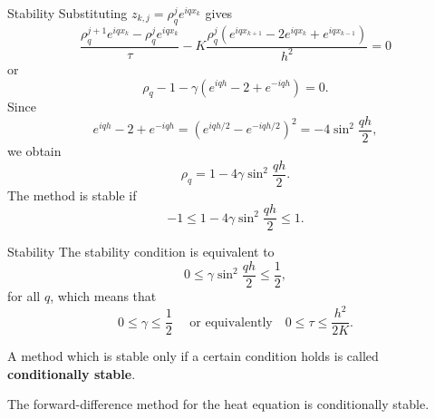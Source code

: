 \documentclass{beamer}
\begin{document}

\begin{frame}{Stability}
Substituting $z_{k,j}=\rho_{q}^{j}e^{iqx_{k}}$ gives
\[
\frac{\rho_{q}^{j+1}e^{iqx_{k}}-\rho_{q}^{j}e^{iqx_{k}}}{\tau}-
K\frac{\rho_{q}^{j}\left(e^{iqx_{k+1}}-2e^{iqx_{k}}+e^{iqx_{k-1}}\right)}{h^2}=0
\]
or
\[
\rho_{q}-1 - \gamma \left(e^{iqh}-2+e^{-iqh}\right)=0.
\]
Since
\[
e^{iqh}-2+e^{-iqh}=\left(e^{iqh/2}-e^{-iqh/2}\right)^{2}=-4\sin^{2}
\frac{qh}{2},
\]
we obtain
\[
\rho_{q}=1-4\gamma\sin^{2} \frac{qh}{2}.
\]
The method is stable if
\[
-1\leq 1-4\gamma\sin^{2}\frac{qh}{2}\leq 1 .
\]



\end{frame}


\begin{frame}{Stability}
The stability condition is equivalent to
\[
0\leq \gamma\sin^{2}\frac{qh}{2}\leq \frac{1}{2},
\]
for all $q$, which means that
\[
0\leq\gamma \leq \frac{1}{2} \quad \text{ or equivalently} \quad0\leq \tau \leq
\frac{h^2}{2K}. 
\]

\vskip 3mm   A method which is stable only if a certain
condition holds is called {\bf conditionally stable}. 

The
forward-difference method for the heat equation is conditionally
stable.

\end{frame}
\end{document}
